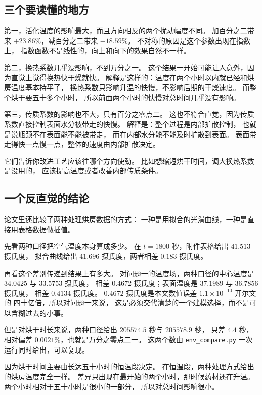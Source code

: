 \subsection{三个要读懂的地方}

第一，活化温度的影响最大，而且方向相反的两个扰动幅度不同。
加百分之二带来 $+23.86\%$，减百分之二带来 $-18.59\%$。
不对称的原因是这个参数出现在指数上，
指数函数不是线性的，向上和向下的效果自然不一样。

第二，换热系数几乎没影响，不到万分之一。
这个结果一开始可能让人意外，因为直觉上觉得换热快干燥就快。
解释是这样的：温度在两个小时以内就已经和烘房温度基本持平了，
换热系数只影响升温的快慢，不影响后期的干燥速度。
而整个烘干要五十多个小时，
所以前面两个小时的快慢对总时间几乎没有影响。

第三，传质系数的影响也不大，只有百分之零点二。
这也不符合直觉，因为传质系数直接控制表面水分被带走的快慢。
解释是：整个过程是内部扩散控制，
也就是说瓶颈不在表面能不能被带走，
而在内部水分能不能及时扩散到表面。
表面带走得快一点慢一点，整体的速度由内部扩散决定。

它们告诉你改进工艺应该往哪个方向使劲。
比如想缩短烘干时间，调大换热系数是没用的，
应该提高温度或者改善内部传质条件。

\subsection{一个反直觉的结论}

论文里还比较了两种处理烘房数据的方式：
一种是用拟合的光滑曲线，一种是直接用表格数据做插值。

先看两种口径把空气温度本身算成多少。
在 $t=1800$ 秒，附件表格给出 $41.513$ 摄氏度，
拟合曲线给出 $41.696$ 摄氏度，两者相差 $0.183$ 摄氏度。

再看这个差别传递到结果上有多大。
对问题一的温度场，两种口径的中心温度是 $34.0425$ 与 $33.5753$ 摄氏度，
相差 $0.4672$ 摄氏度；表面温度是 $37.1989$ 与 $36.7856$ 摄氏度，
相差 $0.4134$ 摄氏度。
$0.4672$ 摄氏度是本文数值误差 $1.1\times10^{-10}$ 开尔文的
四十亿倍，所以对问题一来说，
这是必须交代清楚的一个建模选择，而不是可以含糊过去的小事。

但是对烘干时长来说，两种口径给出 $205574.5$ 秒与 $205578.9$ 秒，
只差 $4.4$ 秒，相对偏差 $0.0021\%$，也就是万分之零点二一。
这两个数由 \texttt{env\_compare.py} 一次运行同时给出，可以复现。

因为烘干时间主要由长达五十小时的恒温段决定。
在恒温段，两种处理方式给出的烘房温度完全一样。
差异只出现在最开始的两个小时，那时候药材还在升温。
两个小时相对于五十小时是很小的一部分，
所以对总时间影响很小。


